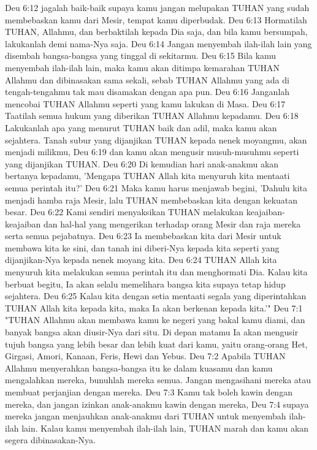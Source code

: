 Deu 6:12  jagalah baik-baik supaya kamu jangan melupakan TUHAN yang sudah membebaskan kamu dari Mesir, tempat kamu diperbudak.
Deu 6:13  Hormatilah TUHAN, Allahmu, dan berbaktilah kepada Dia saja, dan bila kamu bersumpah, lakukanlah demi nama-Nya saja.
Deu 6:14  Jangan menyembah ilah-ilah lain yang disembah bangsa-bangsa yang tinggal di sekitarmu.
Deu 6:15  Bila kamu menyembah ilah-ilah lain, maka kamu akan ditimpa kemarahan TUHAN Allahmu dan dibinasakan sama sekali, sebab TUHAN Allahmu yang ada di tengah-tengahmu tak mau disamakan dengan apa pun.
Deu 6:16  Janganlah mencobai TUHAN Allahmu seperti yang kamu lakukan di Masa.
Deu 6:17  Taatilah semua hukum yang diberikan TUHAN Allahmu kepadamu.
Deu 6:18  Lakukanlah apa yang menurut TUHAN baik dan adil, maka kamu akan sejahtera. Tanah subur yang dijanjikan TUHAN kepada nenek moyangmu, akan menjadi milikmu,
Deu 6:19  dan kamu akan mengusir musuh-musuhmu seperti yang dijanjikan TUHAN.
Deu 6:20  Di kemudian hari anak-anakmu akan bertanya kepadamu, 'Mengapa TUHAN Allah kita menyuruh kita mentaati semua perintah itu?'
Deu 6:21  Maka kamu harus menjawab begini, 'Dahulu kita menjadi hamba raja Mesir, lalu TUHAN membebaskan kita dengan kekuatan besar.
Deu 6:22  Kami sendiri menyaksikan TUHAN melakukan keajaiban-keajaiban dan hal-hal yang mengerikan terhadap orang Mesir dan raja mereka serta semua pejabatnya.
Deu 6:23  Ia membebaskan kita dari Mesir untuk membawa kita ke sini, dan tanah ini diberi-Nya kepada kita seperti yang dijanjikan-Nya kepada nenek moyang kita.
Deu 6:24  TUHAN Allah kita menyuruh kita melakukan semua perintah itu dan menghormati Dia. Kalau kita berbuat begitu, Ia akan selalu memelihara bangsa kita supaya tetap hidup sejahtera.
Deu 6:25  Kalau kita dengan setia mentaati segala yang diperintahkan TUHAN Allah kita kepada kita, maka Ia akan berkenan kepada kita.'"
Deu 7:1  "TUHAN Allahmu akan membawa kamu ke negeri yang bakal kamu diami, dan banyak bangsa akan diusir-Nya dari situ. Di depan matamu Ia akan mengusir tujuh bangsa yang lebih besar dan lebih kuat dari kamu, yaitu orang-orang Het, Girgasi, Amori, Kanaan, Feris, Hewi dan Yebus.
Deu 7:2  Apabila TUHAN Allahmu menyerahkan bangsa-bangsa itu ke dalam kuasamu dan kamu mengalahkan mereka, bunuhlah mereka semua. Jangan mengasihani mereka atau membuat perjanjian dengan mereka.
Deu 7:3  Kamu tak boleh kawin dengan mereka, dan jangan izinkan anak-anakmu kawin dengan mereka,
Deu 7:4  supaya mereka jangan menjauhkan anak-anakmu dari TUHAN untuk menyembah ilah-ilah lain. Kalau kamu menyembah ilah-ilah lain, TUHAN marah dan kamu akan segera dibinasakan-Nya.
